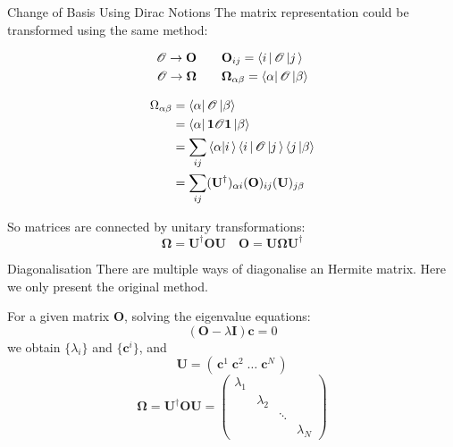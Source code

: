 \documentclass[aspectratio=169,10pt,compress,t]{ctexbeamer}
\begin{document}
\begin{frame}{Change of Basis Using Dirac Notions}
The matrix representation could be transformed using the same method:

\begin{equation*}
\begin{aligned}
  \mathscr{O} \rightarrow \mathbf{O} \quad & \quad \mathbf{O}_{ij} = \bra{i\,} \mathscr{O} \ket{j\,} \\
  \mathscr{O} \rightarrow \boldsymbol{\Omega} \quad & \quad \boldsymbol{\Omega}_{\alpha \beta} = \bra{\alpha} \mathscr{O} \ket{\beta}
\end{aligned}
\end{equation*}

\begin{equation*}
\begin{aligned}
  \Omega_{\alpha \beta} &= \bra{\alpha} \mathscr{O} \ket{\beta} \\
  &= \bra{\alpha} \mathbf{1} \mathscr{O} \mathbf{1} \ket{\beta} \\
  &= \sum_{ij} \braket{\alpha | i\,} \bra{i\,} \mathscr{O} \ket{j\,} \braket{j\, | \beta} \\
  &= \sum_{ij} (\mathbf{U}^\dagger)_{\alpha i} (\mathbf{O})_{ij} (\mathbf{U})_{j \beta}
\end{aligned}
\end{equation*}

So matrices are connected by unitary transformations:
\begin{equation*}
  \boldsymbol{\Omega} = \mathbf{U}^\dagger \mathbf{OU} \quad \mathbf{O} = \mathbf{U} \boldsymbol{\Omega} \mathbf{U}^\dagger 
\end{equation*}

\end{frame}

\begin{frame}{Diagonalisation}
There are multiple ways of diagonalise an Hermite matrix.
Here we only present the original method.

For a given matrix $\mathbf{O}$, solving the eigenvalue equations:
$$(\mathbf{O}-\lambda \mathbf{I}) \mathbf{c} = 0$$
we obtain $\{ \lambda_i \}$ and $\{ \mathbf{c}^i \}$, and
$$\mathbf{U} = \left( \, \mathbf{c}^1 \; \mathbf{c}^2 \; \dots \; \mathbf{c}^N \, \right)$$
$$\boldsymbol{\Omega} = \mathbf{U}^\dagger \mathbf{OU} =
\begin{pmatrix}
\lambda_1 &  & & \\
 & \lambda_2 & & \\
 & & \ddots & \\
 & & & \lambda_N 
\end{pmatrix}
$$

\end{frame}
\end{document}
